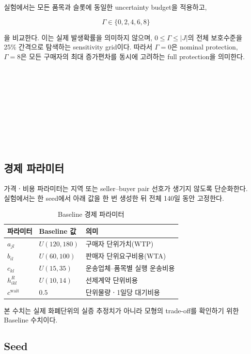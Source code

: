 \documentclass[11pt,a4paper]{article}
\begin{document}
실험에서는 모든 품목과 슬롯에 동일한 uncertainty budget을 적용하고,

\[
\Gamma\in\{0,2,4,6,8\}
\]

을 비교한다.
이는 실제 발생확률을 의미하지 않으며,
$0\le\Gamma\le |J|$의 전체 보호수준을 25\% 간격으로 탐색하는 sensitivity grid이다.
따라서 $\Gamma=0$은 nominal protection,
$\Gamma=8$은 모든 구매자의 최대 증가편차를 동시에 고려하는 full protection을 의미한다.
\\\\\\\\\\\\\\\\\\\\

\subsection{경제 파라미터}

가격ㆍ비용 파라미터는 지역 또는 seller--buyer pair 선호가 생기지 않도록 단순화한다.
실험에서는 한 seed에서 아래 값을 한 번 생성한 뒤 전체 140일 동안 고정한다.

\begin{table}[h!]
\centering
\caption{Baseline 경제 파라미터}
\begin{tabularx}{0.94\textwidth}{@{}p{}p{}X@{}}
\toprule
\textbf{파라미터} & \textbf{Baseline 값} & \textbf{의미} \\
\midrule
$a_{jl}$ & $U(120,180)$ & 구매자 단위가치(WTP) \\
$b_{il}$ & $U(60,100)$ & 판매자 단위요구비용(WTA) \\
$c_{kl}$ & $U(15,35)$ & 운송업체--품목별 실행 운송비용 \\
$h^R_{ikl}$ & $U(10,14)$ & 선제계약 단위비용 \\
$c^{\mathrm{wait}}$ & $0.5$ & 단위물량ㆍ1일당 대기비용 \\
\bottomrule
\end{tabularx}
\end{table}

본 수치는 실제 화폐단위의 실증 추정치가 아니라
모형의 trade-off를 확인하기 위한 Baseline 수치이다.

\subsection{Seed}
\end{document}
